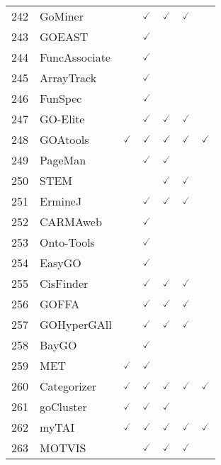 \documentclass[10pt,letterpaper]{article}
\begin{document}
\begin{table}[!ht]
\begin{adjustwidth}{-2.25in}{0in}
\begin{tabular}{|c|l|c|c|c|c|c|}
242 & GoMiner\cite{zeeberg2003gominer} & & $\checked$ & $\checked$ & $\checked$ & \\
243 & GOEAST\cite{zheng2008goeast} & & $\checked$ & & & \\ 
244 & FuncAssociate\cite{berriz2003characterizing} & & $\checked$ & & & \\ 
245 & ArrayTrack\cite{tong2003arraytrack} & & $\checked$ & & & \\ 
246 & FunSpec\cite{robinson2002funspec} & & $\checked$ & & & \\ 
247 & GO-Elite\cite{zambon2012go} & & $\checked$ & $\checked$ & $\checked$ & \\ 
248 & GOAtools\cite{klopfenstein2018goatools} & $\checked$ & $\checked$ & $\checked$ & $\checked$ & $\checked$  \\ 
249 & PageMan\cite{usadel2006pageman} & & $\checked$ & $\checked$ & & \\ 
250 & STEM\cite{ernst2006stem} & & & $\checked$ & $\checked$ & \\ 
251 & ErmineJ\cite{gillis2010gene} & & $\checked$ & $\checked$ & $\checked$ & \\
252 & CARMAweb\cite{rainer2006carmaweb} & & $\checked$ & & & \\
253 & Onto-Tools\cite{draghici2003onto} & & $\checked$ & & & \\
254 & EasyGO\cite{zhou2007easygo} & & $\checked$ & & & \\
255 & CisFinder\cite{sharov2009exhaustive} & & $\checked$ & $\checked$ & $\checked$ & \\ 
256 & GOFFA\cite{sun2006goffa} & & $\checked$ & $\checked$ & $\checked$ & \\ 
257 & GOHyperGAll\cite{horan2008annotating} & & $\checked$ & $\checked$ & $\checked$ & \\ 
258 & BayGO\cite{vencio2006baygo} & & $\checked$ & & & \\ 
259 & MET\cite{blatti2014motif} & $\checked$ & $\checked$ & & & \\
260 & Categorizer\cite{na2014categorizer} & $\checked$ & $\checked$ & $\checked$ & $\checked$ & $\checked$  \\ 
261 & goCluster\cite{wrobel2005gocluster} & $\checked$ & $\checked$ & $\checked$ & & \\ 
262 & myTAI\cite{drost2017mytai} & $\checked$ & $\checked$ & $\checked$ & $\checked$ & $\checked$  \\ 
263 & MOTVIS\cite{verwer2007mature} & & $\checked$ & $\checked$ & $\checked$ & \\ 

\end{tabular}
\end{adjustwidth}
\end{table}
\end{document}
